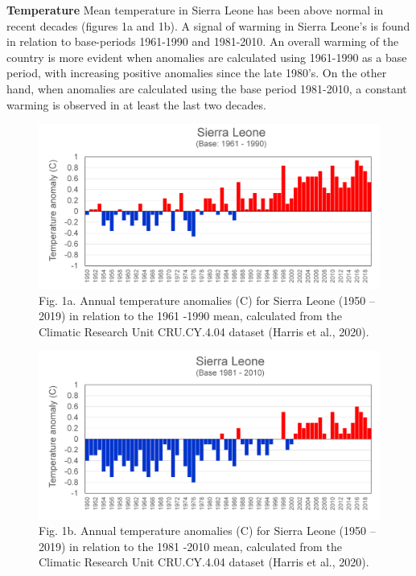 \documentclass[
]{book}
\begin{document}
\textbf{Temperature }
Mean temperature in Sierra Leone has been above normal in recent decades (figures 1a and 1b). A signal of warming in Sierra Leone's is found in relation to base-periods 1961-1990 and 1981-2010. An overall warming of the country is more evident when anomalies are calculated using 1961-1990 as a base period, with increasing positive anomalies since the late 1980's. On the other hand, when anomalies are calculated using the base period 1981-2010, a constant warming is observed in at least the last two decades.

\begin{figure}
\centering
\includegraphics{images/temp_anomaly_1990.png}
\caption{Fig. 1a. Annual temperature anomalies (C) for Sierra Leone (1950 -- 2019) in relation to the 1961 -1990 mean, calculated from the Climatic Research Unit CRU.CY.4.04 dataset (Harris et al., 2020).}
\end{figure}

\begin{figure}
\centering
\includegraphics{images/temp_anomaly_2010.png}
\caption{Fig. 1b. Annual temperature anomalies (C) for Sierra Leone (1950 -- 2019) in relation to the 1981 -2010 mean, calculated from the Climatic Research Unit CRU.CY.4.04 dataset (Harris et al., 2020).}
\end{figure}
\end{document}
